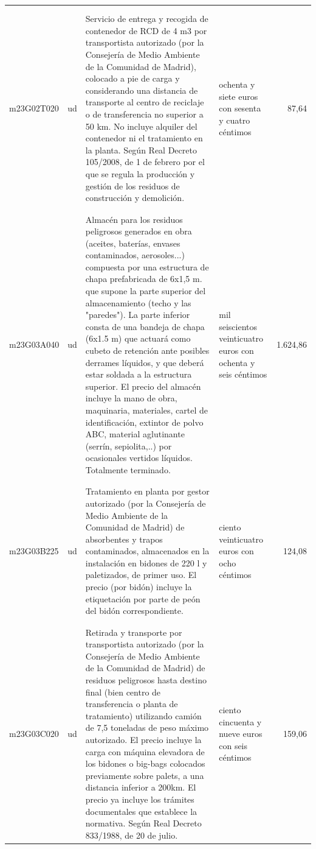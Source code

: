 \documentclass{book}%
\begin{document}
\begin{longtable}{|l|l|p{5cm}|p{3cm}|r|}
&&&&\\%
&&&&\\%
m23G02T020&ud&Servicio de entrega y recogida de contenedor de RCD de 4 m3 por transportista autorizado (por la Consejería de Medio Ambiente de la Comunidad de Madrid), colocado a pie de carga y considerando una distancia de transporte al centro de reciclaje o de transferencia no superior a 50 km. No incluye alquiler del contenedor ni el tratamiento en la planta. Según Real Decreto 105/2008, de 1 de febrero por el que se regula la producción y gestión de los residuos de construcción y demolición.&ochenta y siete euros con sesenta y cuatro céntimos&87,64\\%
&&&&\\%
&&&&\\%
m23G03A040&ud&Almacén para los residuos peligrosos generados en obra (aceites, baterías, envases contaminados, aerosoles...) compuesta por una estructura de chapa prefabricada de 6x1,5 m. que supone la parte superior del almacenamiento (techo y las "paredes"). La parte inferior consta de una bandeja de chapa (6x1.5 m) que actuará como cubeto de retención ante posibles derrames líquidos, y que deberá estar soldada a la estructura superior. El precio del almacén incluye la mano de obra, maquinaria, materiales, cartel de identificación, extintor de polvo ABC, material aglutinante (serrín, sepiolita,..) por ocasionales vertidos líquidos. Totalmente terminado.&mil seiscientos veinticuatro euros con ochenta y seis céntimos&1.624,86\\%
&&&&\\%
&&&&\\%
m23G03B225&ud&Tratamiento en planta por gestor autorizado (por la Consejería de Medio Ambiente de la Comunidad de Madrid) de absorbentes y trapos contaminados, almacenados en la instalación en bidones de 220 l y paletizados, de primer uso. El precio (por bidón) incluye la etiquetación por parte de peón del bidón correspondiente.&ciento veinticuatro euros con ocho céntimos&124,08\\%
&&&&\\%
&&&&\\%
m23G03C020&ud&Retirada y transporte por transportista autorizado (por la Consejería de Medio Ambiente de la Comunidad de Madrid) de residuos peligrosos hasta destino final (bien centro de transferencia o planta de tratamiento) utilizando camión de 7,5 toneladas de peso máximo autorizado. El precio incluye la carga con máquina elevadora de los bidones o big{-}bags colocados previamente sobre palets, a una distancia inferior a 200km. El precio ya incluye los trámites documentales que establece la normativa. Según Real Decreto 833/1988, de 20 de julio.&ciento cincuenta y nueve euros con seis céntimos&159,06\\%

\end{longtable}
\end{document}
